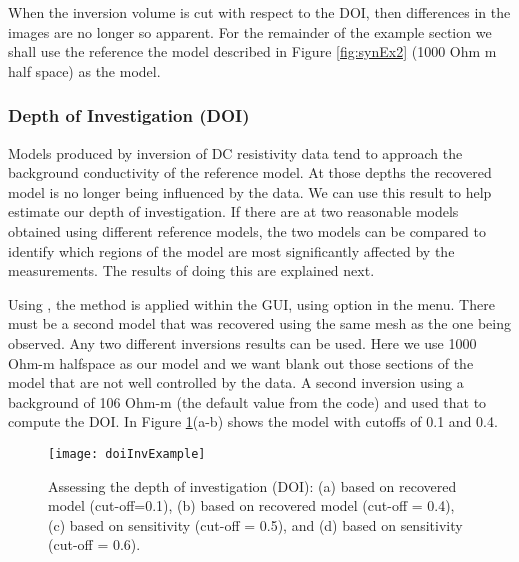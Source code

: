 When the inversion volume is cut with respect to the DOI, then differences in the images are no longer so apparent. For the remainder of the example section we shall use the reference the model described in Figure \ref{fig:synEx2} (1000 Ohm m half space) as the  model.

\subsubsection*{Depth of Investigation (DOI)}
Models produced by inversion of DC resistivity data tend to approach the background conductivity of the reference model. At those depths the recovered model is no longer being influenced by the data. We can use this result to help estimate our depth of investigation. If there are at two reasonable models obtained using different reference models, the two models can be compared to identify which regions of the model are most significantly affected by the measurements. The results of doing this are explained next.

Using \prog, the method is applied within the  GUI, using  option in the  menu. There must be a second model that was recovered using the same mesh as the one being observed. Any two different inversions results can be used. Here we use 1000 Ohm-m halfspace as our  model and we want blank out those sections of the model that are not well controlled by the data. A second inversion using a background of 106 Ohm-m (the default value from the code) and used that to compute the DOI. In Figure \ref{fig:doiInv}(a-b) shows the model with cutoffs of 0.1 and 0.4.
%
\begin{figure}
\centering
\texttt{[image: doiInvExample]}
\caption{Assessing the depth of investigation (DOI): (a) based on recovered model (cut-off=0.1), (b) based on recovered model (cut-off = 0.4), (c) based on sensitivity (cut-off = 0.5), and (d) based on sensitivity (cut-off = 0.6).}
\label{fig:doiInv}
\end{figure}

